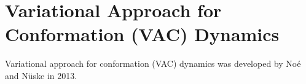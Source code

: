 \section{Variational Approach for Conformation (VAC) Dynamics\label{Sec:DR:VAC}}

Variational approach for conformation (VAC) dynamics was developed by No\'e and N\"uske in 2013.\cite{NoeMMS2013}
